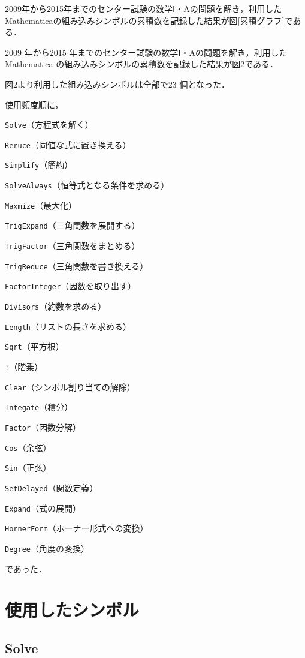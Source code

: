 2009年から2015年までのセンター試験の数学Ⅰ・Aの問題を解き，利用したMathematicaの組み込みシンボルの累積数を記録した結果が図\ref{累積グラフ}である．

2009 年から2015 年までのセンター試験の数学Ⅰ・Aの問題を解き，利用したMathematica の組み込みシンボルの累積数を記録した結果が図2である．

\clearpage

図2より利用した組み込みシンボルは全部で23 個となった．

使用頻度順に，

\verb|Solve|（方程式を解く）

\verb|Reruce|（同値な式に置き換える）

\verb|Simplify|（簡約）

\verb|SolveAlways|（恒等式となる条件を求める）

\verb|Maxmize|（最大化）

\verb|TrigExpand|（三角関数を展開する）

\verb|TrigFactor|（三角関数をまとめる）

\verb|TrigReduce|（三角関数を書き換える）

\verb|FactorInteger|（因数を取り出す）

\verb|Divisors|（約数を求める）

\verb|Length|（リストの長さを求める）

\verb|Sqrt|（平方根）

\verb|!|（階乗）

\verb|Clear|（シンボル割り当ての解除）

\verb|Integate|（積分）

\verb|Factor|（因数分解）

\verb|Cos|（余弦）

\verb|Sin|（正弦）

\verb|SetDelayed|（関数定義）

\verb|Expand|（式の展開）

\verb|HornerForm|（ホーナー形式への変換）

\verb|Degree|（角度の変換）

であった．

\clearpage

\section{使用したシンボル}

\subsection {Solve}

